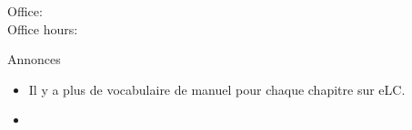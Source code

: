 \documentclass{beamer}
\subtitle[Famille et verbe \lexi{avoir}]{La famille et le verb \lexi{avoir}}
\begin{document}
  \begin{frame}
    \titlepage
    \tiny{Office: \\
          Office hours: }
  \end{frame}

  \begin{frame}{Annonces }
    \begin{itemize}
      \item Il y a plus de vocabulaire de manuel pour chaque chapitre sur eLC.
      \item[] 
    \end{itemize}
  \end{frame}

\end{document}
